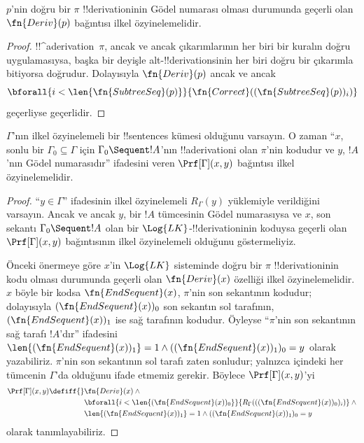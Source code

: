 \begin{prop}
  $p$'nin doğru bir $\pi$ !!{derivation}{}inin Gödel numarası olması durumunda
  geçerli olan $\fn{Deriv}(p)$ bağıntısı ilkel özyinelemelidir.
\end{prop}

\begin{proof}
  !!^a{derivation}~$\pi$, ancak ve ancak çıkarımlarının her biri bir kuralın
  doğru uygulamasıysa, başka bir deyişle alt-!!{derivation}s{}inin her biri
  doğru bir çıkarımla bitiyorsa doğrudur. Dolayısıyla $\fn{Deriv}(p)$ ancak
  ve ancak
  \[
  \bforall{i<\len{\fn{SubtreeSeq}(p)}}{\fn{Correct}((\fn{SubtreeSeq}(p))_i)}
  \]
  geçerliyse geçerlidir.
\end{proof}


\begin{prop}
$\Gamma$'nın ilkel özyinelemeli bir !!{sentence}s kümesi olduğunu varsayın.
O zaman ``$x$, sonlu bir $\Gamma_0 \subseteq \Gamma$ için
$\Gamma_0 \Sequent !A$'nın !!a{derivation}{}i olan $\pi$'nin kodudur ve $y$,
$!A$'nın Gödel numarasıdır'' ifadesini veren $\Prf[\Gamma](x, y)$ bağıntısı
ilkel özyinelemelidir.
\end{prop}

\begin{proof}
``$y \in \Gamma$'' ifadesinin ilkel özyinelemeli $R_\Gamma(y)$ yüklemiyle
verildiğini varsayın. Ancak ve ancak $y$, bir $!A$ tümcesinin Gödel
numarasıysa ve $x$, son sekantı $\Gamma_0 \Sequent !A$ olan bir
$\Log{LK}$-!!{derivation}{}inin koduysa geçerli olan $\Prf[\Gamma](x, y)$
bağıntısının ilkel özyinelemeli olduğunu göstermeliyiz.

Önceki önermeye göre $x$'in $\Log{LK}$ sisteminde doğru bir $\pi$
!!{derivation}{}inin kodu olması durumunda geçerli olan $\fn{Deriv}(x)$
özelliği ilkel özyinelemelidir. $x$ böyle bir kodsa
$\fn{EndSequent}(x)$, $\pi$'nin son sekantının kodudur; dolayısıyla
$(\fn{EndSequent}(x))_0$ son sekantın sol tarafının, 
$(\fn{EndSequent}(x))_1$ ise sağ tarafının kodudur. Öyleyse
``$\pi$'nin son sekantının sağ tarafı $!A$'dır'' ifadesini
$\len{(\fn{EndSequent}(x))_1} = 1 \land ((\fn{EndSequent}(x))_1)_0 = y$
olarak yazabiliriz. $\pi$'nin son sekantının sol tarafı zaten sonludur;
yalnızca içindeki her tümcenin $\Gamma$'da olduğunu ifade etmemiz gerekir.
Böylece $\Prf[\Gamma](x, y)$'yi
\begin{align*}
\Prf[\Gamma](x, y) \defiff {}&
\fn{Deriv}(x) \land {} \\
& \bforall{i <
  \len{(\fn{EndSequent}(x))_0}}{R_\Gamma(((\fn{EndSequent}(x))_0)_i)} \land {}\\
& \len{(\fn{EndSequent}(x))_1} = 1 \land ((\fn{EndSequent}(x))_1)_0 = y
\end{align*}
olarak tanımlayabiliriz.
\end{proof}

